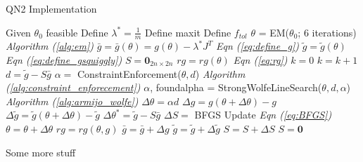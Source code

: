 \documentclass[letter,12pt]{article}
\begin{document}
\begin{algorithm} 
\caption{QN2 Implementation}
\label{alg:qn2}
\begin{algorithmic}[1]
\State Given $\theta_0$ feasible
\State Define $\lambda^* = \frac{1}{m}$
\State Define maxit
\State Define $f_{tol}$
\State $\theta$ = EM($\theta_0$; $6$ iterations)
\indent \indent  \indent\indent \indent \indent \indent \indent  \textit{Algorithm (\ref{alg:em})}
\State $\bar{g} = \bar{g}(\theta) = g(\theta) - \lambda^*J^T$
\indent  \indent \indent\indent \indent \indent \indent \indent \space  \textit{Eqn (\ref{eq:define_g})}
\State $\tilde{g} = \tilde{g}(\theta)$
\indent \indent \indent \indent \indent \indent\indent \indent \indent \indent \indent \space \space \space \textit{Eqn (\ref{eq:define_gsquiggly})}
\State $S = \boldsymbol{0}_{2n \times 2n}$
\State $rg = rg(\theta)$
\indent \indent \indent \indent \indent \indent\indent \indent \indent \indent \indent  \textit{Eqn (\ref{eq:rg})}
\State $k = 0$
\State $k = k + 1$
\State $d = \tilde{g} - S\bar{g}$
\State $\alpha = $ ConstraintEnforcement($\theta,d$) 
\indent \indent \indent \indent \indent \space \space \textit{Algorithm (\ref{alg:constraint_enforecement})}
\State $\alpha$, foundalpha = StrongWolfeLineSearch($\theta,d,\alpha$) 
\indent \indent \textit{Algorithm (\ref{alg:armijo_wolfe})}
\State $\Delta\theta = \alpha d$
\State $\Delta g = g(\theta+\Delta\theta) - g$
\State $\Delta \tilde{g} = \tilde{g}(\theta + \Delta\theta) - \tilde{g}$
\State $\Delta \theta^* = \tilde{g} - S\bar{g}$
\State $\Delta S = $ BFGS Update 
\indent \indent \indent \indent \indent \indent \indent \space \space \textit{Eqn (\ref{eq:BFGS})}
\State $\theta = \theta + \Delta\theta$
\State $rg = rg(\theta,g)$
\State $\bar{g} = \bar{g}+\Delta g$
\State $\tilde{g} = \tilde{g}+\Delta \tilde{g}$
\State $S = S +\Delta S$
\Else
\State $S = \boldsymbol{0}$
\EndIf
\EndWhile
\end{algorithmic}
\end{algorithm}


Some more stuff

\pagebreak


\end{document}
